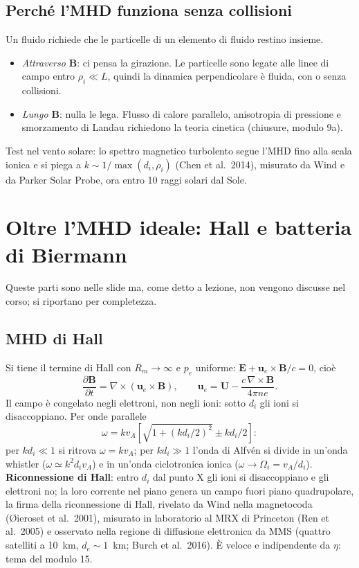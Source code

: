 \subsection{Perché l'MHD funziona senza collisioni}
Un fluido richiede che le particelle di un elemento di fluido restino insieme.
\begin{itemize}
\item \textit{Attraverso $\mathbf{B}$}: ci pensa la girazione. Le particelle sono legate alle linee di campo entro $\rho_i\ll L$, quindi la dinamica perpendicolare è fluida, con o senza collisioni.
\item \textit{Lungo $\mathbf{B}$}: nulla le lega. Flusso di calore parallelo, anisotropia di pressione e smorzamento di Landau richiedono la teoria cinetica (chiusure, modulo 9a).
\end{itemize}
Test nel vento solare: lo spettro magnetico turbolento segue l'MHD fino alla scala ionica e si piega a $k\sim1/\max(d_i,\rho_i)$ (Chen et al.~2014), misurato da Wind e da Parker Solar Probe, ora entro 10 raggi solari dal Sole.

\section{Oltre l'MHD ideale: Hall e batteria di Biermann}
Queste parti sono nelle slide ma, come detto a lezione, non vengono discusse nel corso; si riportano per completezza.

\subsection{MHD di Hall}
Si tiene il termine di Hall con $R_m\to\infty$ e $p_e$ uniforme: $\mathbf{E}+\mathbf{u}_e\times\mathbf{B}/c=0$, cioè
\begin{equation}
\frac{\partial\mathbf{B}}{\partial t}=\nabla\times(\mathbf{u}_e\times\mathbf{B}),\qquad\mathbf{u}_e=\mathbf{U}-\frac{c\,\nabla\times\mathbf{B}}{4\pi ne}.
\end{equation}
Il campo è congelato negli elettroni, non negli ioni: sotto $d_i$ gli ioni si disaccoppiano. Per onde parallele
\begin{equation}
\omega=kv_A\left[\sqrt{1+(kd_i/2)^2}\pm kd_i/2\right]:
\end{equation}
per $kd_i\ll1$ si ritrova $\omega=kv_A$; per $kd_i\gg1$ l'onda di Alfv\'en si divide in un'onda whistler ($\omega\simeq k^2d_iv_A$) e in un'onda ciclotronica ionica ($\omega\to\Omega_i=v_A/d_i$).
\textbf{Riconnessione di Hall}: entro $d_i$ dal punto X gli ioni si disaccoppiano e gli elettroni no; la loro corrente nel piano genera un campo fuori piano quadrupolare, la firma della riconnessione di Hall, rivelato da Wind nella magnetocoda (\O ieroset et al.~2001), misurato in laboratorio al MRX di Princeton (Ren et al.~2005) e osservato nella regione di diffusione elettronica da MMS (quattro satelliti a 10~km, $d_e\sim1$~km; Burch et al.~2016). È veloce e indipendente da $\eta$: tema del modulo 15.

